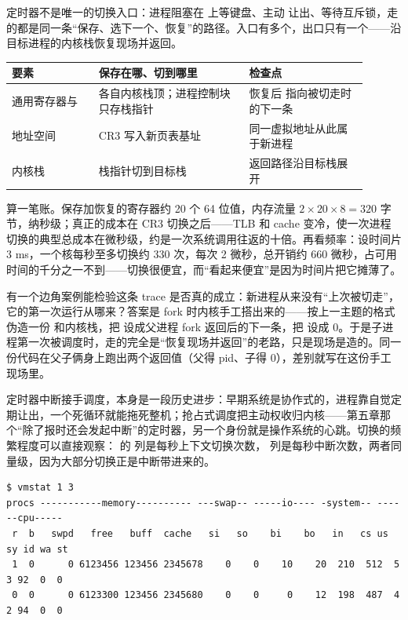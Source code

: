定时器不是唯一的切换入口：进程阻塞在  上等键盘、主动  让出、等待互斥锁，走的都是同一条“保存、选下一个、恢复”的路径。入口有多个，出口只有一个——沿目标进程的内核栈恢复现场并返回。

\begin{longtable}{L{0.22\linewidth}L{0.38\linewidth}L{0.30\linewidth}}
\toprule
要素 & 保存在哪、切到哪里 & 检查点 \\
\midrule
通用寄存器与  & 各自内核栈顶；进程控制块只存栈指针 & 恢复后  指向被切走时的下一条 \\
地址空间 & CR3 写入新页表基址 & 同一虚拟地址从此属于新进程 \\
内核栈 & 栈指针切到目标栈 & 返回路径沿目标栈展开 \\
\bottomrule
\end{longtable}

算一笔账。保存加恢复的寄存器约 20 个 64 位值，内存流量 $2\times20\times8=320$ 字节，纳秒级；真正的成本在 CR3 切换之后——TLB 和 cache 变冷，使一次进程切换的典型总成本在微秒级，约是一次系统调用往返的十倍。再看频率：设时间片 3 ms，一个核每秒至多切换约 330 次，每次 2 微秒，总开销约 660 微秒，占可用时间的千分之一不到——切换很便宜，而“看起来便宜”是因为时间片把它摊薄了。

有一个边角案例能检验这条 trace 是否真的成立：新进程从来没有“上次被切走”，它的第一次运行从哪来？答案是 fork 时内核手工搭出来的——按上一主题的格式伪造一份  和内核栈，把  设成父进程 fork 返回后的下一条，把  设成 0。于是子进程第一次被调度时，走的完全是“恢复现场并返回”的老路，只是现场是造的。同一份代码在父子俩身上跑出两个返回值（父得 pid、子得 0），差别就写在这份手工现场里。

定时器中断接手调度，本身是一段历史进步：早期系统是协作式的，进程靠自觉定期让出，一个死循环就能拖死整机；抢占式调度把主动权收归内核——第五章那个“除了报时还会发起中断”的定时器，另一个身份就是操作系统的心跳。切换的频繁程度可以直接观察： 的  列是每秒上下文切换次数， 列是每秒中断次数，两者同量级，因为大部分切换正是中断带进来的。

\begin{lstlisting}
$ vmstat 1 3
procs -----------memory---------- ---swap-- -----io---- -system-- ------cpu-----
 r  b   swpd   free   buff  cache   si   so    bi    bo   in   cs us sy id wa st
 1  0      0 6123456 123456 2345678    0    0    10    20  210  512  5  3 92  0  0
 0  0      0 6123300 123456 2345680    0    0     0    12  198  487  4  2 94  0  0
\end{lstlisting}

